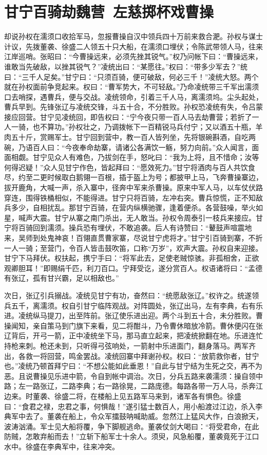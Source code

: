 \chapter{甘宁百骑劫魏营~左慈掷杯戏曹操}

却说孙权在濡须口收拾军马，忽报曹操自汉中领兵四十万前来救合淝。孙权与谋士计议，先拨董袭、徐盛二人领五十只大船，在濡须口埋伏；令陈武带领人马，往来江岸巡哨。张昭曰：“今曹操远来，必须先挫其锐气。”权乃问帐下曰：“曹操远来，谁敢当先破敌，以挫其锐气？”凌统出曰：“某愿往。”权曰：“带多少军去？”统曰：“三千人足矣。”甘宁曰：“只须百骑，便可破敌，何必三千！”凌统大怒。两个就在孙权面前争竞起来。权曰：“曹军势大，不可轻敌。”乃命凌统带三千军出濡须口去哨探，遇曹兵，便与交战。凌统领命，引着三千人马，离濡须坞。尘头起处，曹兵早到。先锋张辽与凌统交锋，斗五十合，不分胜败。孙权恐凌统有失，令吕蒙接应回营。甘宁见凌统回，即告权曰：“宁今夜只带一百人马去劫曹营；若折了一人一骑，也不算功。”孙权壮之，乃调拨帐下一百精锐马兵付宁；又以酒五十瓶，羊肉五十斤，赏赐军士。甘宁回到营中，教一百人皆列坐，先将银碗斟酒，自吃两碗，乃语百人曰：“今夜奉命劫寨，请诸公各满饮一觞，努力向前。”众人闻言，面面相觑。甘宁见众人有难色，乃拔剑在手，怒叱曰：“我为上将，且不惜命；汝等何得迟疑！”众人见甘宁作色，皆起拜曰：“愿效死力。”甘宁将酒肉与百人共饮食尽，约至二更时候取白鹅翎一百根，插于盔上为号；都披甲上马，飞奔曹操寨边，拔开鹿角，大喊一声，杀入寨中，径奔中军来杀曹操。原来中军人马，以车仗伏路穿连，围得铁桶相似，不能得进。甘宁只将百骑，左冲右突。曹兵惊慌，正不知敌兵多少，自相扰乱。那甘宁百骑，在营内纵横驰骤，逢着便杀。各营鼓噪，举火如星，喊声大震。甘宁从寨之南门杀出，无人敢当。孙权令周泰引一枝兵来接应。甘宁将百骑回到濡须。操兵恐有埋伏，不敢追袭。后人有诗赞曰：“鼙鼓声喧震地来，吴师到处鬼神哀！百翎直贯曹家寨，尽说甘宁虎将才。”甘宁引百骑到寨，不折一人一骑；至营门，令百人皆击鼓吹笛，口称“万岁”，欢声大震。孙权自来迎接。甘宁下马拜伏。权扶起，携宁手曰：“将军此去，足使老贼惊骇。非孤相舍，正欲观卿胆耳！”即赐绢千匹，利刀百口。宁拜受讫，遂分赏百人。权语诸将曰：“孟德有张辽，孤有甘兴霸，足以相敌也。”

次日，张辽引兵搦战。凌统见甘宁有功，奋然曰：“统愿敌张辽。”权许之。统遂领兵五千，离濡须。权自引甘宁临阵观战。对阵圆处，张辽出马，左有李典，右有乐进。凌统纵马提刀，出至阵前。张辽使乐进出迎。两个斗到五十合，未分胜败。曹操闻知，亲自策马到门旗下来看，见二将酣斗，乃令曹休暗放冷箭。曹休便闪在张辽背后，开弓一箭，正中凌统坐下马，那马直立起来，把凌统掀翻在地。乐进连忙持枪来刺。枪还未到，只听得弓弦响处，一箭射中乐进面门，翻身落马。两军齐出，各救一将回营，鸣金罢战。凌统回寨中拜谢孙权。权曰：“放箭救你者，甘宁也。”凌统乃顿首拜宁曰：“不想公能如此垂恩！”自此与甘宁结为生死之交，再不为恶。且说曹操见乐进中箭，令自到帐中调治。次日，分兵五路来袭濡须：操自领中路；左一路张辽，二路李典；右一路徐晃，二路庞德。每路各带一万人马，杀奔江边来。时董袭、徐盛二将，在楼船上见五路军马来到，诸军各有惧色。徐盛曰：“食君之禄，忠君之事，何惧哉！”遂引猛士数百人，用小船渡过江边，杀入李典军中去了。董袭在船上，令众军擂鼓呐喊助威。忽然江上猛风大作，白浪掀天，波涛汹涌。军士见大船将覆，争下脚舰逃命。董袭仗剑大喝曰：“将受君命，在此防贼，怎敢弃船而去！”立斩下船军士十余人。须臾，风急船覆，董袭竟死于江口水中。徐盛在李典军中，往来冲突。

